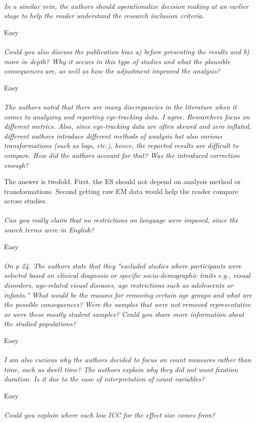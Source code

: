 \documentclass[english,natbib,man,floatsintext]{apa6}
\newcommand\eatpunct[1]{}
\newcommand{\com}[2][]{\vspace{5mm}\paragraph[ ]{ \eatpunct}\label{#1}\emph{#2}\vspace{5mm}}
\begin{document}
\com[com-r2-XX]{In a similar vein, the authors should operationalize decision making at an earlier stage to help the reader understand the research inclusion criteria.}

Easy


\com[com-r2-XX]{Could you also discuss the publication bias a) before presenting the results and b) more in depth? Why it occurs in this type of studies and what the plausible consequences are, as well as how the adjustment improved the analysis?}

Easy


\com[com-r2-XX]{The authors noted that there are many discrepancies in the literature when it comes to analyzing and reporting eye-tracking data. I agree. Researchers focus on different metrics. Also, since eye-tracking data are often skewed and zero inflated, different authors introduce different methods of analysis but also various transformations (such as logs, etc.), hence, the reported results are difficult to compare. How did the authors account for that? Was the introduced correction enough?}

The answer is twofold. First, the ES should not depend on analysis method or transformations. Second getting raw EM data would help the reader compare across studies.


\com[com-r2-XX]{Can you really claim that no restrictions on language were imposed, since the search terms were in English?}

Easy


\com[com-r2-XX]{On p 24. The authors state that they "excluded studies where participants were selected based on clinical diagnosis or specific socio-demographic traits e.g., visual disorders, age-related visual diseases, age restrictions such as adolescents or infants." What would be the reasons for removing certain age groups and what are the possible consequences? Were the samples that were not removed representative or were these mostly student samples? Could you share more information about the studied populations?}

Easy


\com[com-r2-XX]{I am also curious why the authors decided to focus on count measures rather than time, such as dwell time? The authors explain why they did not want fixation duration. Is it due to the ease of interpretation of count variables?}

Easy


\com[com-r2-XX]{Could you explain where such low ICC for the effect size comes from?}
\end{document}
